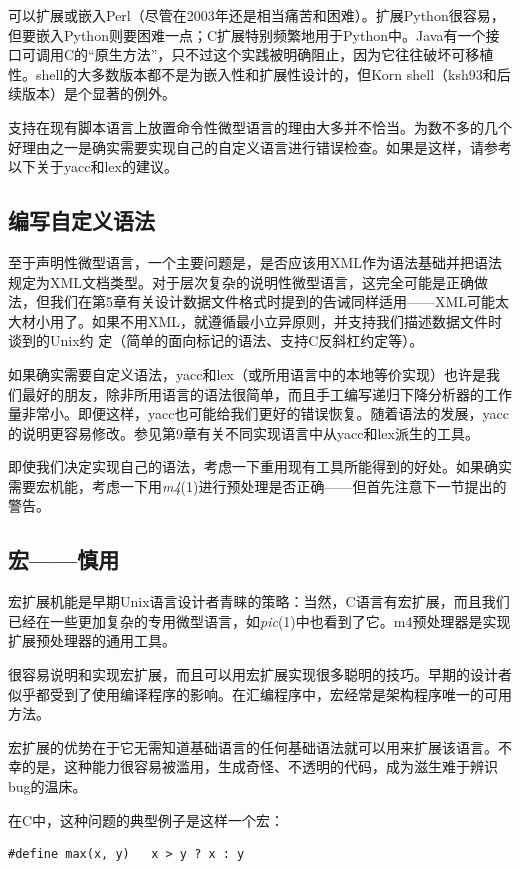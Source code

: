 \documentclass[12pt,oneside]{book}
\begin{document}
可以扩展或嵌入Perl（尽管在2003年还是相当痛苦和困难）。扩展Python很容易，但要嵌入Python则要困难一点；C扩展特别频繁地用于Python中。Java有一个接口可调用C的“原生方法”，只不过这个实践被明确阻止，因为它往往破坏可移植性。shell的大多数版本都不是为嵌入性和扩展性设计的，但Korn shell（ksh93和后续版本）是个显著的例外。

支持在现有脚本语言上放置命令性微型语言的理由大多并不恰当。为数不多的几个好理由之一是确实需要实现自己的自定义语言进行错误检查。如果是这样，请参考以下关于yacc和lex的建议。


\subsection{编写自定义语法}
至于声明性微型语言，一个主要问题是，是否应该用XML作为语法基础并把语法规定为XML文档类型。对于层次复杂的说明性微型语言，这完全可能是正确做法，但我们在第5章有关设计数据文件格式时提到的告诫同样适用——XML可能太大材小用了。如果不用XML，就遵循最小立异原则，并支持我们描述数据文件时谈到的Unix约
定（简单的面向标记的语法、支持C反斜杠约定等）。

如果确实需要自定义语法，yacc和lex（或所用语言中的本地等价实现）也许是我们最好的朋友，除非所用语言的语法很简单，而且手工编写递归下降分析器的工作量非常小。即便这样，yacc也可能给我们更好的错误恢复。随着语法的发展，yacc的说明更容易修改。参见第9章有关不同实现语言中从yacc和lex派生的工具。

即使我们决定实现自己的语法，考虑一下重用现有工具所能得到的好处。如果确实需要宏机能，考虑一下用\textit{m4}(1)进行预处理是否正确——但首先注意下一节提出的警告。

\subsection{宏——慎用}
宏扩展机能是早期Unix语言设计者青睐的策略：当然，C语言有宏扩展，而且我们已经在一些更加复杂的专用微型语言，如\textit{pic}(1)中也看到了它。m4预处理器是实现扩展预处理器的通用工具。

很容易说明和实现宏扩展，而且可以用宏扩展实现很多聪明的技巧。早期的设计者似乎都受到了使用编译程序的影响。在汇编程序中，宏经常是架构程序唯一的可用方法。

宏扩展的优势在于它无需知道基础语言的任何基础语法就可以用来扩展该语言。不幸的是，这种能力很容易被滥用，生成奇怪、不透明的代码，成为滋生难于辨识bug的温床。

在C中，这种问题的典型例子是这样一个宏：
\begin{Verbatim}
#define max(x, y)	x > y ? x : y
\end{Verbatim}
\end{document}

